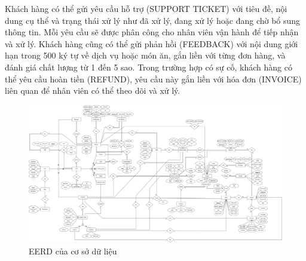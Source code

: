 Khách hàng có thể gửi yêu cầu hỗ trợ (SUPPORT TICKET) với tiêu đề, nội dung cụ thể và trạng thái xử lý như đã xử lý, đang xử lý hoặc đang chờ bổ sung thông tin. Mỗi yêu cầu sẽ được phân công cho nhân viên vận hành để tiếp nhận và xử lý. Khách hàng cũng có thể gửi phản hồi (FEEDBACK) với nội dung giới hạn trong 500 ký tự về dịch vụ hoặc món ăn, gắn liền với từng đơn hàng, và đánh giá chất lượng từ 1 đến 5 sao. Trong trường hợp có sự cố, khách hàng có thể yêu cầu hoàn tiền (REFUND), yêu cầu này gắn liền với hóa đơn (INVOICE) liên quan để nhân viên có thể theo dõi và xử lý.

\begin{landscape}
	\begin{figure}[H]
		\centering
		\includegraphics[height=0.85\textheight]{Images/db.png}
		\vspace{0.5cm}
		\caption{EERD của cơ sở dữ liệu}
		\label{fig:my_label}
	\end{figure}
\end{landscape}



